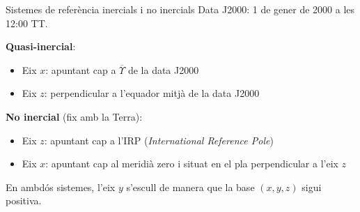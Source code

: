\documentclass{beamer} %
\begin{document}
\begin{frame}{Sistemes de referència inercials i no inercials}
  Data J2000: 1 de gener de 2000 a les 12:00 TT.
  \vspace{0.5cm}

  \textbf{Quasi-inercial}:
  \begin{itemize}
    \item Eix $x$: apuntant cap a $\overline{\Upsilon}$ de la data J2000
    \item Eix $z$: perpendicular a l'equador mitjà de la data J2000
  \end{itemize}

  \textbf{No inercial} (fix amb la Terra):
  \begin{itemize}
    \item Eix $z$: apuntant cap a l'IRP (\emph{International Reference Pole})
    \item Eix $x$: apuntant cap al meridià zero i situat en el pla perpendicular a l'eix $z$
  \end{itemize}

  En ambdós sistemes, l'eix $y$ s'escull de manera que la base $(x,y,z)$ sigui positiva.
\end{frame}
\end{document}
